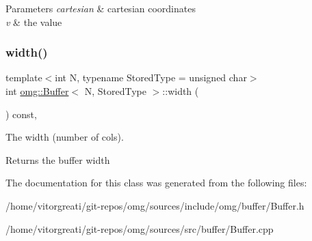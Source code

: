 \begin{DoxyParams}{Parameters}
{\em cartesian} & cartesian coordinates \\
\hline
{\em v} & the value \\
\hline
\end{DoxyParams}
\mbox{\label{classomg_1_1_buffer_aa5b24d2a6fb4b994561d2558a640da65}} 
\subsubsection{\texorpdfstring{width()}{width()}}
{\footnotesize\ttfamily template$<$int N, typename Stored\+Type = unsigned char$>$ \\
int \mbox{\hyperlink{classomg_1_1_buffer}{omg\+::\+Buffer}}$<$ N, Stored\+Type $>$\+::width (\begin{DoxyParamCaption}{ }\end{DoxyParamCaption}) const\hspace{0.3cm}{\ttfamily [inline]}, {\ttfamily [noexcept]}}



The width (number of cols). 

\begin{DoxyReturn}{Returns}
the buffer width 
\end{DoxyReturn}


The documentation for this class was generated from the following files\+:\begin{DoxyCompactItemize}
\item 
/home/vitorgreati/git-\/repos/omg/sources/include/omg/buffer/Buffer.\+h\item 
/home/vitorgreati/git-\/repos/omg/sources/src/buffer/Buffer.\+cpp\end{DoxyCompactItemize}
